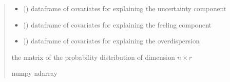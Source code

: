 \documentclass[letterpaper,10pt,english]{sphinxmanual}
\begin{document}
\begin{fulllineitems}
\begin{quote}
\begin{description}
\begin{itemize}
\item {} 
\sphinxAtStartPar
{} () \textendash{} dataframe of covariates for explaining the uncertainty component

\item {} 
\sphinxAtStartPar
{} () \textendash{} dataframe of covariates for explaining the feeling component

\item {} 
\sphinxAtStartPar
{} () \textendash{} dataframe of covariates for explaining the overdispersion

\end{itemize}

\sphinxAtStartPar
the matrix of the probability distribution of dimension \(n \times r\)

\sphinxAtStartPar
numpy ndarray

\end{description}\end{quote}

\end{fulllineitems}

\end{document}
